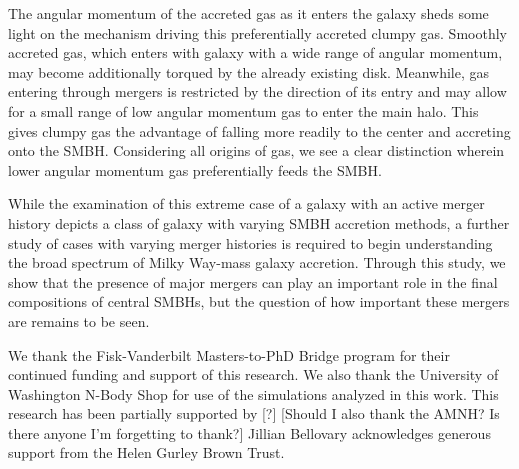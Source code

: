 \documentclass[manuscript]{aastex}
\begin{document}
The angular momentum of the accreted gas as it enters the galaxy sheds some light on the mechanism driving this preferentially accreted clumpy gas. Smoothly accreted gas, which enters with galaxy with a wide range of angular momentum, may become additionally torqued by the already existing disk. Meanwhile, gas entering through mergers is restricted by the direction of its entry and may allow for a small range of low angular momentum gas to enter the main halo. This gives clumpy gas the advantage of falling more readily to the center and accreting onto the SMBH. Considering all origins of gas, we see a clear distinction wherein lower angular momentum gas preferentially feeds the SMBH.

While the examination of this extreme case of a galaxy with an active merger history depicts a class of galaxy with varying SMBH accretion methods, a further study of cases with varying merger histories is required to begin understanding the broad spectrum of Milky Way-mass galaxy accretion. Through this study, we show that the presence of major mergers can play an important role in the final compositions of central SMBHs, but the question of how important these mergers are remains to be seen.



\acknowledgments
We thank the Fisk-Vanderbilt Masters-to-PhD Bridge program for their continued funding and support of this research.
We also thank the University of Washington N-Body Shop for use of the simulations analyzed in this work. 
This research has been partially supported by [?] 
[Should I also thank the AMNH? Is there anyone I'm forgetting to thank?] 
Jillian Bellovary acknowledges generous support from the Helen Gurley Brown Trust.


\end{document}
